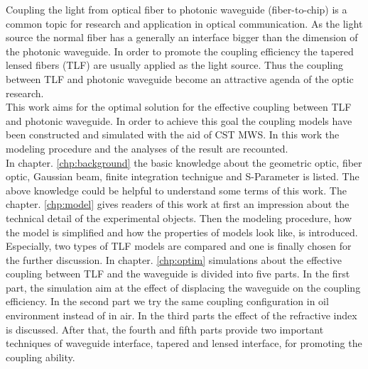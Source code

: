 
Coupling the light from optical fiber to photonic waveguide (fiber-to-chip) is a common topic for research and application in optical communication. As the light source the normal fiber has a generally an interface bigger than the dimension of the photonic waveguide. In order to promote the coupling efficiency the tapered lensed fibers (TLF) are usually applied as the light source. Thus the coupling between TLF and photonic waveguide become an attractive agenda of the optic research. \\ 

This work aims for the optimal solution for the effective coupling between TLF and photonic waveguide. In order to achieve this goal the coupling models have been constructed and simulated with the aid of CST MWS. In this work the modeling procedure and the analyses of the result are recounted.\\

In chapter. \ref{chp:background} the basic knowledge about the geometric optic, fiber optic, Gaussian beam, finite integration technigue and S-Parameter is listed. The above knowledge could be helpful to understand some terms of this work. The chapter. \ref{chp:model} gives readers of this work at first an impression about the technical detail of the experimental objects. Then the modeling procedure, how the model is simplified and how the properties of models look like, is introduced. Especially, two types of TLF models are compared and one is finally chosen for the further discussion. In chapter. \ref{chp:optim} simulations about the effective coupling between TLF and the waveguide is divided into five parts. In the first part, the simulation aim at the effect of displacing the waveguide on the coupling efficiency. In the second part we try the same coupling configuration in oil environment instead of in air. In the third parts the effect of the refractive index is discussed. After that, the fourth and fifth parts provide two important techniques of waveguide interface, tapered and lensed interface, for promoting the coupling ability.\\        
 
